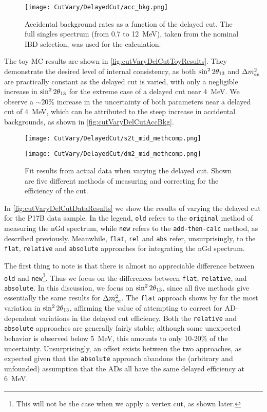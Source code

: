 \documentclass[../thesis.tex]{subfiles}
\begin{document}
\begin{figure}[ht]
  \texttt{[image: CutVary/DelayedCut/acc\_bkg.png]}
  \caption{Accidental background rates as a function of the delayed cut. The full singles spectrum (from 0.7 to 12~MeV), taken from the nominal IBD selection, was used for the calculation.}
  \label{fig:cutVaryDelCutAccBkg}
\end{figure}

The toy MC results are shown in \autoref{fig:cutVaryDelCutToyResults}. They demonstrate the desired level of internal consistency, as both $\sin^2 2\theta_{13}$ and $\Delta m^2_{ee}$ are practically constant as the delayed cut is varied, with only a negligible increase in $\sin^2 2\theta_{13}$ for the extreme case of a delayed cut near 4~MeV. We observe a $\sim$20\% increase in the uncertainty of both parameters near a delayed cut of 4~MeV, which can be attributed to the steep increase in accidental backgrounds, as shown in \autoref{fig:cutVaryDelCutAccBkg}.

\begin{figure}[ht]
  \begin{minipage}{0.5\linewidth}%
    \texttt{[image: CutVary/DelayedCut/s2t\_mid\_methcomp.png]}%
  \end{minipage}%
  \begin{minipage}{0.5\linewidth}%
    \texttt{[image: CutVary/DelayedCut/dm2\_mid\_methcomp.png]}%
  \end{minipage}%
  \caption{Fit results from actual data when varying the delayed cut. Shown are five different methods of measuring and correcting for the efficiency of the cut.}
  \label{fig:cutVaryDelCutDataResults}
\end{figure}

In \autoref{fig:cutVaryDelCutDataResults} we show the results of varying the delayed cut for the P17B data sample. In the legend, \texttt{old} refers to the \texttt{original} method of measuring the nGd spectrum, while \texttt{new} refers to the \texttt{add-then-calc} method, as described previously. Meanwhile, \texttt{flat}, \texttt{rel} and \texttt{abs} refer, unsurprisingly, to the \texttt{flat}, \texttt{relative} and \texttt{absolute} approaches for integrating the nGd spectrum.

The first thing to note is that there is almost no appreciable difference between \texttt{old} and \texttt{new}\footnote{This will not be the case when we apply a vertex cut, as shown later.}. Thus we focus on the differences between \texttt{flat}, \texttt{relative}, and \texttt{absolute}. In this discussion, we focus on $\sin^2 2\theta_{13}$, since all five methods give essentially the same results for $\Delta m^2_{ee}$. The \texttt{flat} approach shows by far the most variation in $\sin^2 2\theta_{13}$, affirming the value of attempting to correct for AD-dependent variations in the delayed cut efficiency. Both the \texttt{relative} and \texttt{absolute} approaches are generally fairly stable; although some unexpected behavior is observed below 5~MeV, this amounts to only 10-20\% of the uncertainty. Unsurprisingly, an offset exists between the two approaches, as expected given that the \texttt{absolute} approach abandons the (arbitrary and unfounded) assumption that the ADs all have the same delayed efficiency at 6~MeV.
\end{document}
